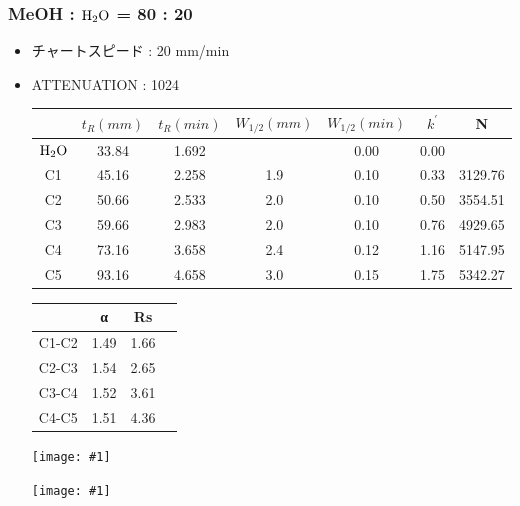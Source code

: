 \documentclass[a4paper,papersize,dvipdfmx]{jsarticle}
\newcommand{\pict}[2]{\begin{center} \texttt{[image: \#1]} \end{center}}   %
\begin{document}
\subsubsection*{MeOH : $\rm H_2O$ = 80 : 20}

\begin{itemize}
\item チャートスピード : 20 mm/min
\item ATTENUATION : 1024

\begin{table}[H]
\begin{center}
\begin{tabular}{|c|c|c|c|c|c|c|}
\hline
&  $t_R(mm)$ & $t_R(min)$ & $W_{1/2}(mm)$ & $W_{1/2}(min)$ & $k^\prime$   & N    \\ \hline
$\rm H_2O$      & 33.84     & 1.692          &                 & 0.00 & 0.00 &         \\ \hline
C1       & 45.16     & 2.258          & 1.9             & 0.10 & 0.33 & 3129.76 \\ \hline
C2       & 50.66     & 2.533          & 2.0             & 0.10 & 0.50 & 3554.51 \\ \hline
C3       & 59.66     & 2.983          & 2.0             & 0.10 & 0.76 & 4929.65 \\ \hline
C4       & 73.16     & 3.658          & 2.4             & 0.12 & 1.16 & 5147.95 \\ \hline
C5       & 93.16     & 4.658          & 3.0             & 0.15 & 1.75 & 5342.27 \\ \hline
\end{tabular}
\end{center}
\end{table}


\begin{table}[H]
\begin{center}
\begin{tabular}{|c|c|c|c|}
\hline
& α    & Rs   &  \\ \hline
C1-C2 & 1.49 & 1.66 &  \\ \hline
C2-C3 & 1.54 & 2.65 &  \\ \hline
C3-C4 & 1.52 & 3.61 &  \\ \hline
C4-C5 & 1.51 & 4.36 &  \\ \hline
\end{tabular}
\end{center}
\end{table}

\pict{imgs/kp.png}{10}
\pict{imgs/log_kp.png}{10}

\end{itemize}
\end{document}
